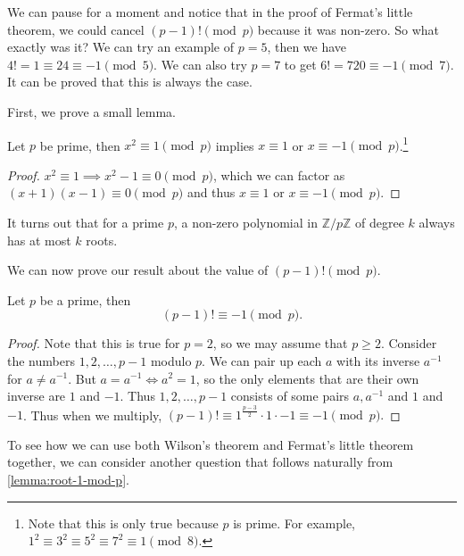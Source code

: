 \documentclass[a4paper]{scrartcl}
\begin{document}
We can pause for a moment and notice that in the proof of Fermat's little theorem, we could cancel $(p - 1)! \pmod{p}$ because it was non-zero. So what exactly was it? We can try an example of $p = 5$, then we have $4! = 1 \equiv 24 \equiv - 1 \pmod{5}$. We can also try $p = 7$ to get $6! = 720 \equiv -1 \pmod{7}$. It can be proved that this is always the case.

First, we prove a small lemma.

\begin{lemma}\label{lemma:root-1-mod-p}
	Let $p$ be prime, then $x^2 \equiv 1 \pmod{p}$ implies $x \equiv 1$ or $x \equiv -1 \pmod{p}$.\footnote{Note that this is only true because $p$ is prime. For example, $1^2 \equiv 3^2 \equiv 5^2 \equiv 7^2 \equiv 1 \pmod{8}$.}
\end{lemma}
\begin{proof}
	$x^2 \equiv 1 \implies x^2 - 1 \equiv 0 \pmod{p}$, which we can factor as $(x + 1)(x - 1) \equiv 0 \pmod{p}$ and thus $x \equiv 1$ or $x \equiv -1 \pmod{p}$.
\end{proof}
\begin{remark}
	It turns out that for a prime $p$, a non-zero polynomial in $\mathbb{Z}/p\mathbb{Z}$ of degree $k$ always has at most $k$ roots.
\end{remark}

We can now prove our result about the value of $(p - 1)! \pmod{p}$.

\begin{theorem}
	Let $p$ be a prime, then
	$$
	(p - 1)! \equiv - 1\pmod{p}.
	$$
\end{theorem}
\begin{proof}
	Note that this is true for $p = 2$, so we may assume that $p \geq 2$. Consider the numbers $1, 2, \dots, p - 1$ modulo $p$. We can pair up each $a$ with its inverse $a^{-1}$ for $a \neq a^{-1}$. But $a = a^{-1} \iff a^2 = 1$, so the only elements that are their own inverse are $1$ and $-1$. Thus $1, 2, \dots, p - 1$ consists of some pairs $a, a^{-1}$ and $1$ and $-1$. Thus when we multiply,
	$
	(p - 1)! \equiv 1^{\frac{p - 3}{2}} \cdot 1 \cdot -1 \equiv -1 \pmod{p}.
	$
\end{proof}

To see how we can use both Wilson's theorem and Fermat's little theorem together, we can consider another question that follows naturally from \autoref{lemma:root-1-mod-p}.
\end{document}
